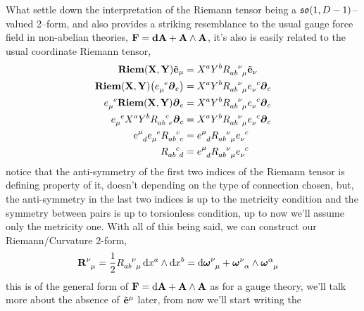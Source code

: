 What settle down the interpretation of the Riemann tensor being a $\mathfrak{so}\qty(1,D-1)$--valued 2--form, and also provides a striking resemblance to the usual gauge force field in non-abelian 
theories, $\vb F=\vb d\vb A+\vb A\wedge \vb A$, it's also is easily related to the usual coordinate Riemann tensor,
\begin{align*}
    \textbf{Riem}\qty(\vb X,\vb Y)\tilde{\vb e}_\mu&=X^aY^b\tensor{R}{_a_b^\nu_\mu}\tilde{\vb e}_\nu\\
    \textbf{Riem}\qty(\vb X,\vb Y)\qty(\tensor{e}{_\mu^e}\boldsymbol\partial_e)&=X^aY^b\tensor{R}{_a_b^\nu_\mu}\tensor{e}{_\nu^c}\boldsymbol\partial_c\\
    \tensor{e}{_\mu^e}\textbf{Riem}\qty(\vb X,\vb Y)\boldsymbol\partial_e&=X^aY^b\tensor{R}{_a_b^\nu_\mu}\tensor{e}{_\nu^c}\boldsymbol\partial_c\\
    \tensor{e}{_\mu^e}X^aY^b\tensor{R}{_a_b^c_e}\boldsymbol\partial_c&=X^aY^b\tensor{R}{_a_b^\nu_\mu}\tensor{e}{_\nu^c}\boldsymbol\partial_c\\
    \tensor{e}{^\mu_d}\tensor{e}{_\mu^e}\tensor{R}{_a_b^c_e}&=\tensor{e}{^\mu_d}\tensor{R}{_a_b^\nu_\mu}\tensor{e}{_\nu^c}\\
    \tensor{R}{_a_b^c_d}&=\tensor{e}{^\mu_d}\tensor{R}{_a_b^\nu_\mu}\tensor{e}{_\nu^c}
\end{align*}
notice that the anti-symmetry of the first two indices of the Riemann tensor is defining property of it, doesn't depending on the type of connection 
chosen, but, the anti-symmetry in the last two indices is up to the metricity condition and the symmetry between pairs is up to torsionless condition, 
up to now we'll assume only the metricity one. With all of this being said, we can construct our Riemann/Curvature 2-form,
\begin{align*}
    \tensor{{\vb R}}{^\nu_\mu}&=\frac12\tensor{R}{_a_b^\nu_\mu}\dd{x^a}\wedge\dd{x^b}=\tensor{\dd{\boldsymbol\omega}}{^\nu_\mu}+\tensor{{\boldsymbol\omega}}{^\nu_\alpha}\wedge\tensor{{\boldsymbol\omega}}{^\alpha_\mu}%
\end{align*}
this is of the general form of $\vb F=\dd{\vb A}+\vb A\wedge\vb A$ as for a gauge theory, we'll talk more about the absence of $\tilde{\vb e} ^\mu$ later, from now we'll start writing the 
